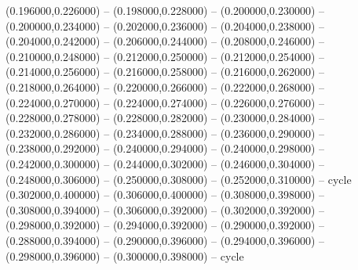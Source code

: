 (0.196000,0.226000) -- (0.198000,0.228000) -- (0.200000,0.230000) -- (0.200000,0.234000) -- (0.202000,0.236000) -- (0.204000,0.238000) -- (0.204000,0.242000) -- (0.206000,0.244000) -- (0.208000,0.246000) -- (0.210000,0.248000) -- (0.212000,0.250000) -- (0.212000,0.254000) -- (0.214000,0.256000) -- (0.216000,0.258000) -- (0.216000,0.262000) -- (0.218000,0.264000) -- (0.220000,0.266000) -- (0.222000,0.268000) -- (0.224000,0.270000) -- (0.224000,0.274000) -- (0.226000,0.276000) -- (0.228000,0.278000) -- (0.228000,0.282000) -- (0.230000,0.284000) -- (0.232000,0.286000) -- (0.234000,0.288000) -- (0.236000,0.290000) -- (0.238000,0.292000) -- (0.240000,0.294000) -- (0.240000,0.298000) -- (0.242000,0.300000) -- (0.244000,0.302000) -- (0.246000,0.304000) -- (0.248000,0.306000) -- (0.250000,0.308000) -- (0.252000,0.310000) -- cycle
   (0.302000,0.400000) -- (0.306000,0.400000) -- (0.308000,0.398000) -- (0.308000,0.394000) -- (0.306000,0.392000) -- (0.302000,0.392000) -- (0.298000,0.392000) -- (0.294000,0.392000) -- (0.290000,0.392000) -- (0.288000,0.394000) -- (0.290000,0.396000) -- (0.294000,0.396000) -- (0.298000,0.396000) -- (0.300000,0.398000) -- cycle
